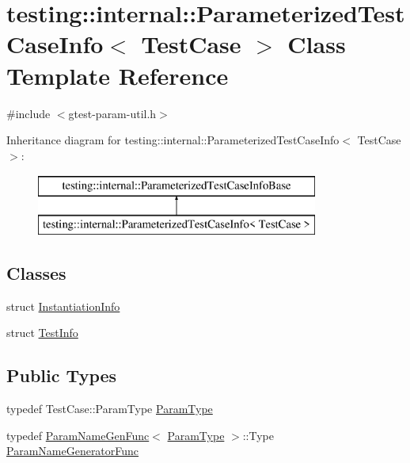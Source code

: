 \hypertarget{classtesting_1_1internal_1_1_parameterized_test_case_info}{}\section{testing\+::internal\+::Parameterized\+Test\+Case\+Info$<$ Test\+Case $>$ Class Template Reference}
\label{classtesting_1_1internal_1_1_parameterized_test_case_info}


{\ttfamily \#include $<$gtest-\/param-\/util.\+h$>$}

Inheritance diagram for testing\+::internal\+::Parameterized\+Test\+Case\+Info$<$ Test\+Case $>$\+:\begin{figure}[H]
\begin{center}
\leavevmode
\includegraphics[height=2.000000cm]{d5/dcd/classtesting_1_1internal_1_1_parameterized_test_case_info}
\end{center}
\end{figure}
\subsection*{Classes}
\begin{DoxyCompactItemize}
\item 
struct \mbox{\hyperlink{structtesting_1_1internal_1_1_parameterized_test_case_info_1_1_instantiation_info}{Instantiation\+Info}}
\item 
struct \mbox{\hyperlink{structtesting_1_1internal_1_1_parameterized_test_case_info_1_1_test_info}{Test\+Info}}
\end{DoxyCompactItemize}
\subsection*{Public Types}
\begin{DoxyCompactItemize}
\item 
typedef Test\+Case\+::\+Param\+Type \mbox{\hyperlink{classtesting_1_1internal_1_1_parameterized_test_case_info_a643a87e178bf92a4246ce21054e44b96}{Param\+Type}}
\item 
typedef \mbox{\hyperlink{structtesting_1_1internal_1_1_param_name_gen_func}{Param\+Name\+Gen\+Func}}$<$ \mbox{\hyperlink{classtesting_1_1internal_1_1_parameterized_test_case_info_a643a87e178bf92a4246ce21054e44b96}{Param\+Type}} $>$\+::Type \mbox{\hyperlink{classtesting_1_1internal_1_1_parameterized_test_case_info_aed6c5184cb8f94cec73e9d7c4b7fa2ce}{Param\+Name\+Generator\+Func}}
\end{DoxyCompactItemize}
